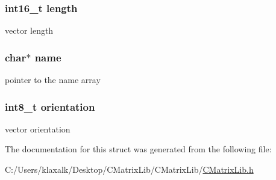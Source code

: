 \subsubsection[{length}]{\setlength{\rightskip}{0pt plus 5cm}int16\+\_\+t length}\label{structvector__float_a0ff9f63e333676ba1359f505d02dd281}
vector length \hypertarget{structvector__float_a5ac083a645d964373f022d03df4849c8}{}
\subsubsection[{name}]{\setlength{\rightskip}{0pt plus 5cm}char$\ast$ name}\label{structvector__float_a5ac083a645d964373f022d03df4849c8}
pointer to the name array \hypertarget{structvector__float_a3b52d30800bf0fc116fe4cc73c54e1c8}{}
\subsubsection[{orientation}]{\setlength{\rightskip}{0pt plus 5cm}int8\+\_\+t orientation}\label{structvector__float_a3b52d30800bf0fc116fe4cc73c54e1c8}
vector orientation 

The documentation for this struct was generated from the following file\+:\begin{DoxyCompactItemize}
\item 
C\+:/\+Users/klaxalk/\+Desktop/\+C\+Matrix\+Lib/\+C\+Matrix\+Lib/\hyperlink{_c_matrix_lib_8h}{C\+Matrix\+Lib.\+h}\end{DoxyCompactItemize}
